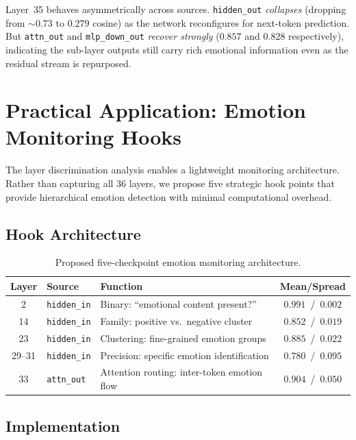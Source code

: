 \documentclass[11pt,a4paper]{article}
\begin{document}
Layer~35 behaves asymmetrically across sources. \texttt{hidden\_out} \emph{collapses} (dropping from ${\sim}0.73$ to $0.279$ cosine) as the network reconfigures for next-token prediction. But \texttt{attn\_out} and \texttt{mlp\_down\_out} \emph{recover strongly} ($0.857$ and $0.828$ respectively), indicating the sub-layer outputs still carry rich emotional information even as the residual stream is repurposed.

\section{Practical Application: Emotion Monitoring Hooks}

The layer discrimination analysis enables a lightweight monitoring architecture. Rather than capturing all 36 layers, we propose five strategic hook points that provide hierarchical emotion detection with minimal computational overhead.

\subsection{Hook Architecture}

\begin{table}[H]
\centering
\caption{Proposed five-checkpoint emotion monitoring architecture.}
\label{tab:hooks}
\small
\begin{tabular}{@{}cllc@{}}
\toprule
Layer & Source & Function & Mean/Spread \\
\midrule
2 & \texttt{hidden\_in} & Binary: ``emotional content present?'' & $0.991$~/~$0.002$ \\
14 & \texttt{hidden\_in} & Family: positive vs.\ negative cluster & $0.852$~/~$0.019$ \\
23 & \texttt{hidden\_in} & Clustering: fine-grained emotion groups & $0.885$~/~$0.022$ \\
29--31 & \texttt{hidden\_in} & Precision: specific emotion identification & $0.780$~/~$0.095$ \\
33 & \texttt{attn\_out} & Attention routing: inter-token emotion flow & $0.904$~/~$0.050$ \\
\bottomrule
\end{tabular}
\end{table}

\subsection{Implementation}
\end{document}
